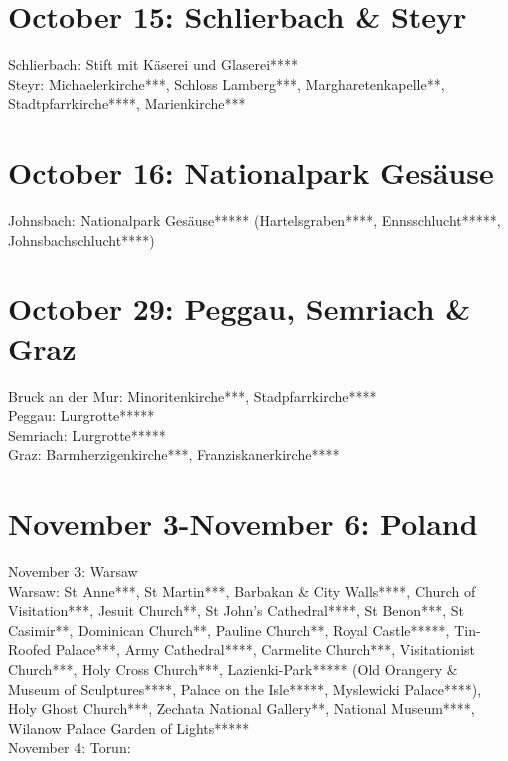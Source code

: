 \section{October 15: Schlierbach \& Steyr}
\label{2022:Schlierbach}

Schlierbach: Stift mit K\"aserei und Glaserei****\\
Steyr: Michaelerkirche***, Schloss Lamberg***, Margharetenkapelle**, Stadtpfarrkirche****, Marienkirche***\\

\section{October 16: Nationalpark Ges\"ause}
\label{2022:Gesaeuse}

Johnsbach: Nationalpark Ges\"ause***** (Hartelsgraben****, Ennsschlucht*****, Johnsbachschlucht****)

\section{October 29: Peggau, Semriach \& Graz}
\label{2022:Lurgrotte}

Bruck an der Mur: Minoritenkirche***, Stadpfarrkirche****\\
Peggau: Lurgrotte*****\\
Semriach: Lurgrotte*****\\
Graz: Barmherzigenkirche***, Franziskanerkirche****

\section{November 3-November 6: Poland}
\label{2022:Warsaw}

November 3: Warsaw\\

Warsaw: St Anne***, St Martin***, Barbakan \& City Walls****, Church of Visitation***, Jesuit Church**, St John's Cathedral****, St Benon***, St Casimir**, Dominican Church**, Pauline Church**, Royal Castle*****, Tin-Roofed Palace***, Army Cathedral****, Carmelite Church***, 
Visitationist Church***, Holy Cross Church***, Lazienki-Park***** (Old Orangery \& Museum of Sculptures****, Palace on the Isle*****, Myslewicki Palace****), Holy Ghost Church***, Zechata National Gallery**, National Museum****, Wilanow Palace Garden of Lights*****\\

November 4: Torun:\\

